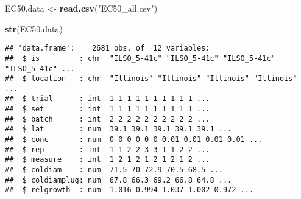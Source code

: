 \documentclass[
]{article}
\newenvironment{Shaded}{\begin{snugshade}}{\end{snugshade}}
\newcommand{\AttributeTok}[1]{\textcolor[rgb]{0.13,0.29,0.53}{#1}}
\newcommand{\ConstantTok}[1]{\textcolor[rgb]{0.56,0.35,0.01}{#1}}
\newcommand{\DecValTok}[1]{\textcolor[rgb]{0.00,0.00,0.81}{#1}}
\newcommand{\FunctionTok}[1]{\textcolor[rgb]{0.13,0.29,0.53}{\textbf{#1}}}
\newcommand{\NormalTok}[1]{#1}
\newcommand{\OtherTok}[1]{\textcolor[rgb]{0.56,0.35,0.01}{#1}}
\newcommand{\SpecialCharTok}[1]{\textcolor[rgb]{0.81,0.36,0.00}{\textbf{#1}}}
\newcommand{\StringTok}[1]{\textcolor[rgb]{0.31,0.60,0.02}{#1}}
\begin{document}
\begin{Shaded}
\begin{Highlighting}[]
\NormalTok{EC50.data }\OtherTok{\textless{}{-}} \FunctionTok{read.csv}\NormalTok{(}\StringTok{"EC50\_all.csv"}\NormalTok{)}

\FunctionTok{str}\NormalTok{(EC50.data)}
\end{Highlighting}
\end{Shaded}

\begin{verbatim}
## 'data.frame':    2681 obs. of  12 variables:
##  $ is         : chr  "ILSO_5-41c" "ILSO_5-41c" "ILSO_5-41c" "ILSO_5-41c" ...
##  $ location   : chr  "Illinois" "Illinois" "Illinois" "Illinois" ...
##  $ trial      : int  1 1 1 1 1 1 1 1 1 1 ...
##  $ set        : int  1 1 1 1 1 1 1 1 1 1 ...
##  $ batch      : int  2 2 2 2 2 2 2 2 2 2 ...
##  $ lat        : num  39.1 39.1 39.1 39.1 39.1 ...
##  $ conc       : num  0 0 0 0 0 0 0.01 0.01 0.01 0.01 ...
##  $ rep        : int  1 1 2 2 3 3 1 1 2 2 ...
##  $ measure    : int  1 2 1 2 1 2 1 2 1 2 ...
##  $ coldiam    : num  71.5 70 72.9 70.5 68.5 ...
##  $ coldiamplug: num  67.8 66.3 69.2 66.8 64.8 ...
##  $ relgrowth  : num  1.016 0.994 1.037 1.002 0.972 ...
\end{verbatim}

\begin{Shaded}
\end{Shaded}
\end{document}
